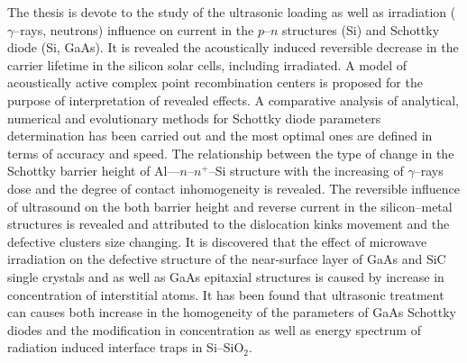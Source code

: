 The thesis is devote to the study of the ultrasonic loading as well as irradiation ($\gamma$--rays, neutrons) influence 
on current in the $p$--$n$ structures (Si) and Schottky diode (Si, GaAs).
It is revealed the acoustically induced reversible decrease in the carrier lifetime in the silicon solar cells,
 including irradiated.
 A model of acoustically active complex point recombination centers is proposed for the purpose of interpretation of revealed effects.
 A comparative analysis of analytical, numerical and evolutionary methods for Schottky diode parameters determination  has been carried out and
 the most optimal ones are defined in terms of accuracy and speed.
 The relationship between the type of change in the Schottky barrier height of Al---$n$--$n^+$--Si structure with the increasing of $\gamma$--rays dose 
 and the degree of contact inhomogeneity is revealed.
 The reversible influence of ultrasound on the both barrier height and reverse current in the silicon--metal structures is revealed and attributed to
the dislocation kinks movement and the defective clusters size changing.
 It is discovered that the effect of microwave irradiation on the defective structure of the near-surface layer of GaAs and SiC single crystals and as well as GaAs epitaxial structures
 is caused by increase in concentration of interstitial atoms.
 It has been found that ultrasonic treatment can causes both  increase in the homogeneity of the parameters of GaAs Schottky diodes and the modification in concentration as well as energy spectrum of radiation induced interface traps in Si--SiO$_2$.

\keywordsEn
